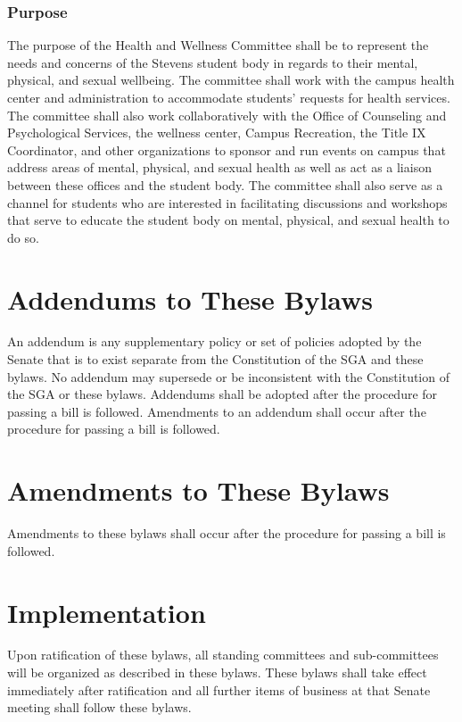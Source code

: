 \documentclass[12pt]{scrreprt}
\begin{document}
\subsection{Purpose}
The purpose of the Health and Wellness Committee shall be to represent the needs and
concerns of the Stevens student body in regards to their mental, physical, and sexual
wellbeing. The committee shall work with the campus health center and administration to
accommodate students’ requests for health services. The committee shall also work
collaboratively with the Office of Counseling and Psychological Services, the wellness
center, Campus Recreation, the Title IX Coordinator, and other organizations to sponsor
and run events on campus that address areas of mental, physical, and sexual health as
well as act as a liaison between these offices and the student body. The committee shall also serve as a channel for students who are interested in facilitating discussions and workshops that serve to educate the student body on mental, physical, and sexual health to do so. 

\chapter{Addendums to These Bylaws} \label{sec:addendums}
An addendum is any supplementary policy or set of policies adopted by the Senate that is to exist separate from the Constitution of the SGA and these bylaws. No addendum may supersede or be inconsistent with the Constitution of the SGA or these bylaws. 
Addendums shall be adopted after the procedure for passing a bill is followed. 
Amendments to an addendum shall occur after the procedure for passing a bill is followed.

\chapter{Amendments to These Bylaws} \label{sec:amendments}
Amendments to these bylaws shall occur after the procedure for passing a bill 
is followed. 

\chapter{Implementation}
Upon ratification of these bylaws, all standing committees and sub-committees 
will be organized as described in these bylaws. These bylaws shall take effect 
immediately after ratification and all further items of business at that 
Senate meeting shall follow these bylaws. 
\end{document}
